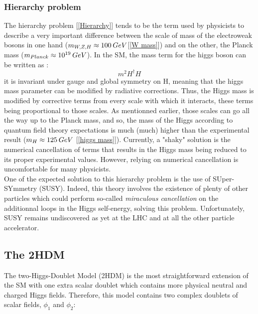 \documentclass [12pt] {article}
\numberwithin{equation}{section} %
\numberwithin{figure}{section}   %
\newcommand{\HHquad}{\hspace{0.2em}}
\begin{document}
\subsubsection*{Hierarchy problem}

The hierarchy problem [\ref{Hierarchy}] tends to be the term used by physicists to describe a very important difference between the scale of mass of the electroweak bosons in one hand ($m_{W,Z,H} \approx 100 \HHquad GeV$[\ref{W mass}]) and on the other, the Planck mass ($m_{Planck} \approx 10^{19} \HHquad GeV $). In the SM, the mass term for the higgs boson can be written as :
\begin{equation}
    m^2 H^\dag H
\end{equation}
it is invariant under gauge and global symmetry on H, meaning that the higgs mass parameter can be modified by radiative corrections. Thus, the Higgs mass is modified by corrective terms from every scale with which it interacts, these terms being proportional to those scales. As mentionned earlier, those scales can go all the way up to the Planck mass, and so, the mass of the Higgs according to quantum field theory expectations is much (much) higher than the experimental result ($m_H \approx 125 \HHquad GeV$ [\ref{higgs mass}]). Currently, a "shaky" solution is the numerical cancellation of terms that results in the Higgs mass being reduced to its proper experimental values. However, relying on numerical cancellation is uncomfortable for many physicists.\\
One of the expected solution to this hierarchy problem is the use of SUper-SYmmetry (SUSY). Indeed, this theory involves the existence of plenty of other particles which could perform so-called \textit{miraculous cancellation} on the additionnal loops in the Higgs self-energy, solving this problem. Unfortunately, SUSY remains undiscovered as yet at the LHC and at all the other particle accelerator.


\subsection{The 2HDM}
The two-Higgs-Doublet Model (2HDM) is the most straightforward extension of the SM with one extra scalar doublet which contains more physical neutral and charged Higgs fields. Therefore, this model contains two complex doublets of scalar fields, $\phi_1$ and $\phi_2$:
\end{document}
